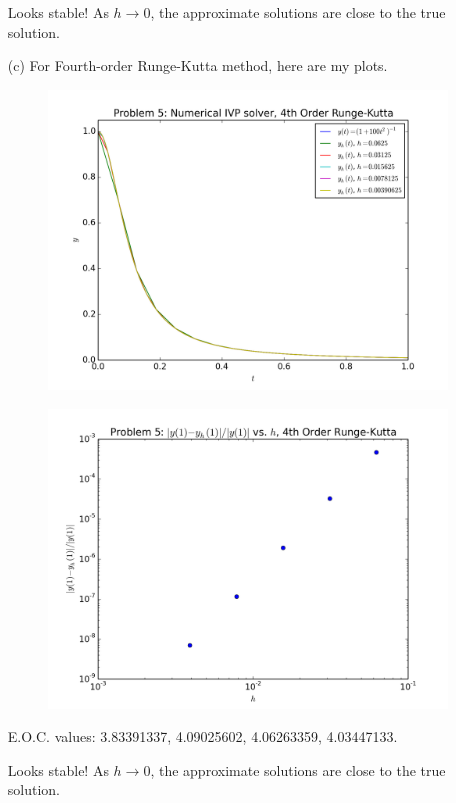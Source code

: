 \documentclass[10pt]{article}
\begin{document}
\begin{itemize}
Looks stable! As $h \to 0$, the approximate solutions are close to the true solution.

\newpage

\item[(c)] For Fourth-order Runge-Kutta method, here are my plots.

\begin{figure}[H]
  \centering
    \includegraphics[scale=0.6]{ivp_sol_rk}
\end{figure}

\begin{figure}[H]
  \centering
    \includegraphics[scale=0.6]{ivp_err_rk}
\end{figure}

E.O.C. values: 3.83391337,  4.09025602,  4.06263359,  4.03447133.

Looks stable! As $h \to 0$, the approximate solutions are close to the true solution.

\end{itemize}
\end{document}
